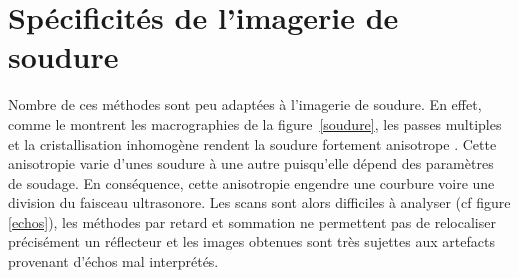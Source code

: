 \section{Spécificités de l'imagerie de soudure}

Nombre de ces méthodes sont peu adaptées à l'imagerie de soudure. En effet, comme le montrent les macrographies de la figure~\ref{soudure}, les passes multiples et la cristallisation inhomogène rendent la soudure fortement anisotrope \citep{chassignole}. Cette anisotropie varie d'unes soudure à une autre puisqu'elle dépend des paramètres de soudage. En conséquence, cette anisotropie engendre une courbure voire une division du faisceau ultrasonore. Les scans sont alors difficiles à analyser (cf figure \ref{echos}), les méthodes par retard et sommation ne permettent pas de relocaliser précisément un réflecteur et les images obtenues sont très sujettes aux artefacts provenant d'échos mal interprétés.

